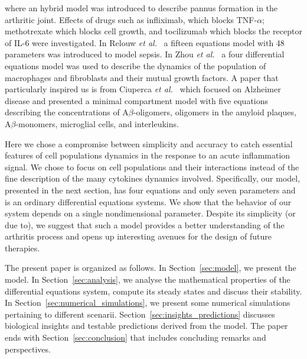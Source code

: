 \documentclass[a4paper, 12pt]{article}
\begin{document}
 where an hybrid model was introduced to describe pannus formation in the arthritic joint.
Effects of drugs such as inﬂiximab, which blocks TNF-$\alpha$; methotrexate
which blocks cell growth, and tocilizumab
which blocks the receptor of IL-6 were investigated.
In Relouw \textit{et al.}~\cite{relouw} a fifteen equations model with 48 parameters was introduced to model sepsis.
In Zhou \textit{et al.}~\cite{zhou2018} a four differential equations model was used to describe the dynamics of the population of macrophages and fibroblasts  and their mutual growth factors.
A paper that particularly inspired us 
is from Ciuperca \textit{et al.}~\cite{torres2024} which focused on Alzheimer disease and presented a minimal compartment model with  five equations describing the concentrations of 
 A$\beta$-oligomers,
oligomers in the amyloid plaques,
A$\beta$-monomers,
microglial cells, and
interleukins.

Here we chose a compromise between simplicity and accuracy   to catch essential features of cell populations dynamics in the response to an acute inflammation signal. We chose to focus on cell populations and their interactions instead of the fine description of the many cytokines dynamics involved.
 Specifically, our model, presented in the next section, has four equations and only seven parameters and is an ordinary differential equations systems. We show that the behavior of our system depends on a single nondimensional parameter.
Despite its simplicity (or due to), we suggest that such a model provides a better understanding of the arthritis process and opens up interesting avenues for the design of future therapies.\par
The present paper is organized as follows.
In Section~\ref{sec:model}, we present the model. In Section~\ref{sec:analysis}, we analyse the mathematical properties of the differential equations system, compute its steady states and discuss their stability. In Section~\ref{sec:numerical_simulations}, we present some numerical simulations pertaining to different scenarii.
Section~\ref{sec:insights_predictions} discusses biological insights and testable predictions derived from the model.
The paper ends with  Section~\ref{sec:conclusion} that includes concluding remarks and  perspectives.
\end{document}
